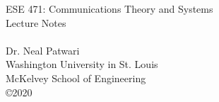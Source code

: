 \documentclass[11pt]{article}
\begin{document}
 \vspace{4in}

\begin{center}{\Large ESE 471: Communications Theory and Systems \\
            Lecture Notes \\
            \ThisSemester}
 \\
   \vspace{2in}
   \vspace{0.21in}
  Dr. Neal Patwari  \\
  Washington University in St. Louis\\
  McKelvey School of Engineering\\
  \copyright 2020
\end{center}
% 
 \newpage
  
  \tableofcontents
  
  \newpage
 


 
 

 

 

 

 

 


 



 \clearpage





 

 

 

  





 

 

  
   \clearpage



\end{document}
